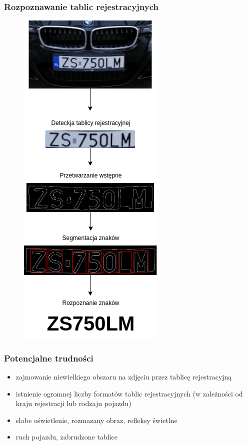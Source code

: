 \documentclass{beamer}
\begin{document}
    \begin{frame}
        \frametitle{Rozpoznawanie tablic rejestracyjnych}
        \begin{figure}
            \includegraphics[scale=0.3]{../WIZUT-Dyplom-styl/Pictures/schemat_lpr}
        \end{figure}
    \end{frame}

    \begin{frame}
        \frametitle{Potencjalne trudności}
        \begin{itemize}
            \item zajmowanie niewielkiego obszaru na zdjęciu przez tablicę rejestracyjną
            \item istnienie ogromnej liczby formatów tablic rejestracyjnych (w zależności od kraju rejestracji lub rodzaju pojazdu)
            \item słabe oświetlenie, rozmazany obraz, refleksy świetlne
            \item ruch pojazdu, zabrudzone tablice
        \end{itemize}
    \end{frame}
\end{document}
